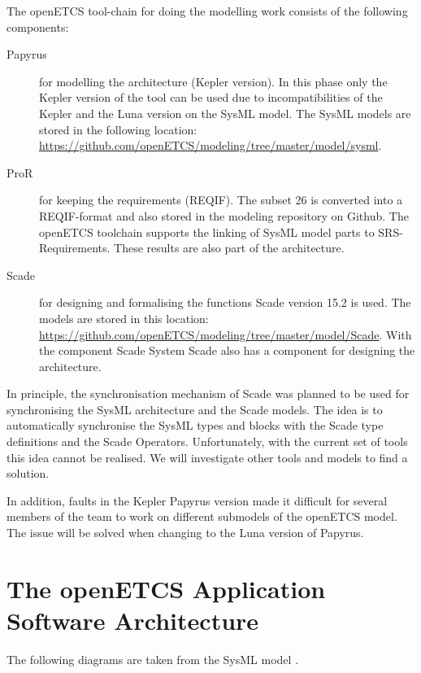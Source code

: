 \documentclass{template/openetcs_report}
\begin{document}
The openETCS tool-chain for doing the modelling work consists of the following components:
\begin{description}
	\item[Papyrus] for modelling the architecture (Kepler version).
	In this phase only the Kepler version of the tool can be used due to incompatibilities of the Kepler and the Luna version on the SysML model. The SysML models are stored in the following location: \url{https://github.com/openETCS/modeling/tree/master/model/sysml}.
	\item[ProR] for keeping the requirements (REQIF).
	The subset 26 is converted into a REQIF-format and also stored in the modeling repository on Github. The openETCS toolchain supports the linking of SysML model parts to SRS-Requirements. These results are also part of the architecture.
	\item[Scade] for designing and formalising the functions Scade version 15.2 is used.
	The models are stored in this location: \url{https://github.com/openETCS/modeling/tree/master/model/Scade}.
	With the component Scade System Scade also has a component for designing the architecture.
\end{description}

In principle, the synchronisation mechanism of Scade was planned to be used for synchronising the SysML architecture and the Scade models. The idea is to automatically synchronise the SysML types and blocks with the Scade type definitions and the Scade Operators. Unfortunately, with the current set of tools this idea cannot be realised. We will investigate other tools and models to find a solution. 

In addition, faults in the Kepler Papyrus version made it difficult for several members of the team to work on different submodels of the openETCS model. The issue will be solved when changing to the Luna version of Papyrus.

\section{The openETCS Application Software Architecture}


The following diagrams are taken from the SysML model \cite{sysml-model}.
\end{document}
